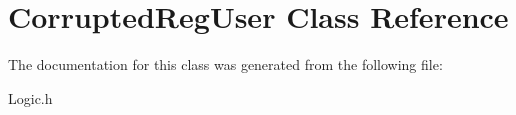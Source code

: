 \hypertarget{class_corrupted_reg_user}{\section{Corrupted\+Reg\+User Class Reference}
\label{class_corrupted_reg_user}
}


The documentation for this class was generated from the following file\+:\begin{DoxyCompactItemize}
\item 
Logic.\+h\end{DoxyCompactItemize}

